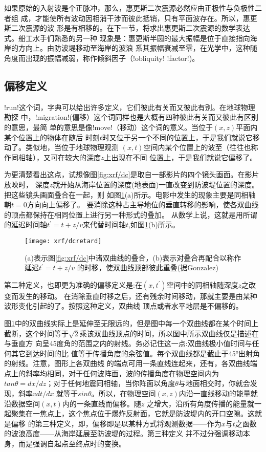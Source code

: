 如果原始的入射波是个正脉冲，那么，惠更斯二次震源必然应由正极性与负极性二者组
成，才能使所有波动因相消干涉而彼此抵销，只有平面波存在。所以，惠更斯二次震源的波
形是有相移的。在下一节，将求出惠更斯二次震源的数学表达式。船工水手们熟悉的另一种
现象是：惠更斯半圆的最大振幅是位于直接指向海岸的方向上。由防波堤移动至海岸的波浪
系其振幅衰减至零，在光学中，这种随角度而出现的振幅减弱，称作倾斜因子（!obliquity!
 !factor!)。

\subsection{偏移定义}
!run!这个词，字典可以给出许多定义，它们彼此有关而又彼此有别。在地球物理勘探
中，!migration!(偏移）这个词同样也是大概有四种彼此有关而又彼此有区别的意思，最简
单的意思是像!move!（移动）这个词的意义。当位于$(x,z)$平面内某个位置上的物体在随后
时刻$t$时又位于另一个不同的位置上，于是我们就说它移动了。类似地，当位于地球物理观测
$(x,t)$空间内某个位置上的波至（往往也称作同相轴），又可在较大的深度$z$上出现在不同
位置上，于是我们就说它偏移了。

为更清楚看出这点，试想像图\ref{fig:xrf/dc}是取自一部影片的四个镜头画面。在影片放映时，
深度$z$就开始从海岸位置的深度(地表面)一直改变到防波堤位置的深度。把这些镜头画面叠合在一起，则
如图\ref{fig:xrf/dcretard}(a)所示。电影中发生的现象主要是同相轴朝$t=0$方向向上偏移了。
要消除这种占主导地位的垂直转移的影响，使各双曲线的顶点都保持在相同位置上进行另一种形式的叠加。
从数学上说，这就是用所谓的延迟时间轴$t^{'}=t+z/v$来代替时间轴$t$,如图\ref{fig:xrf/dcretard}(b)所示。

\begin{figure}[H]
\centering
\texttt{[image: xrf/dcretard]}
\caption[dcretard]{(a)表示图\ref{fig:xrf/dc}中诸双曲线的叠合，(b)表示对叠合再配合以称作延迟$t^{'}=t+z/v$
的时移，使双曲线顶部彼此重叠(据Gonzalez)}
\label{fig:xrf/dcretard}
\end{figure}

第二种定义，也即更为准确的偏移定义是:在$(x,t^{'})$空间中的同相轴随深度$z$之改变而发生的移动。
在消除垂直时移之后，还有残余时间移动，那就主要是由某种波形变化引起的了。按照这种定义，双曲线
顶点或者水平地层是不偏移的。

图\ref{fig:xrf/dcretard}中的双曲线实际上是延伸至无限远的，但是图中每一个双曲线都在某个时间上
截断，这个时间等于$\sqrt{2}$乘该双曲线顶点的时间，所以图中所示双曲线仅是描述在与垂直方
向呈45度角的范围之内的射线。务必记住这一点:双曲线极小值时间与任何其它到达时间的比
值等于传播角度的余弦值。每个双曲线都是截止于45°出射角的射线。注意，图形上各双曲线
的端点可用一条直线连起来，还有，各双曲线端点上的斜率均相同，对于任何波阵面，波的传播角度在物理空间内为
$tan\theta =dx/dz$；对于任何地震同相轴，当你阵面以角度$\theta$与地面相交时，你就会发现，斜率$vdt/dx$
就等于$sin\theta$。所以，在物理空间$(x,z)$内沿一直线移动的能量就沿数据空间$(x,t)$内的一条直线而偏移。随$z$
之增大，沿所有角度传播的能量就一起聚集在一焦点上，这个焦点位于爆炸反射面，它就是防波堤内的开口空隙。这就是偏移
的第三种定义，即，偏移即是以某种方式将观测数据——作为$x$与$t$之函数的波浪高度——从海岸延展至防波堤的过程。第三种定义
并不过分强调移动本身，而是强调自起点至终点时的变换。

